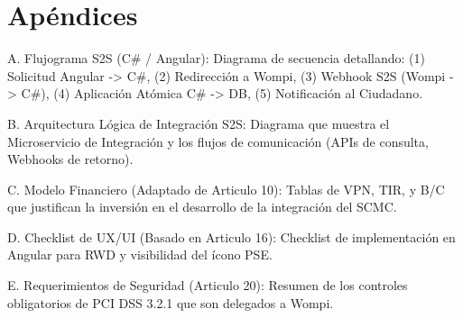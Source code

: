 \section{Apéndices}
A. Flujograma S2S (C\# / Angular): Diagrama de secuencia detallando: (1) Solicitud Angular -> C\#, (2) Redirección a Wompi, (3) Webhook S2S (Wompi -> C\#), (4) Aplicación Atómica C\# -> DB, (5) Notificación al Ciudadano.

B. Arquitectura Lógica de Integración S2S: Diagrama que muestra el Microservicio de Integración y los flujos de comunicación (APIs de consulta, Webhooks de retorno).

C. Modelo Financiero (Adaptado de Articulo 10): Tablas de VPN, TIR, y B/C que justifican la inversión en el desarrollo de la integración del SCMC.

D. Checklist de UX/UI (Basado en Articulo 16): Checklist de implementación en Angular para RWD y visibilidad del ícono PSE.

E. Requerimientos de Seguridad (Articulo 20): Resumen de los controles obligatorios de PCI DSS 3.2.1 que son delegados a Wompi.